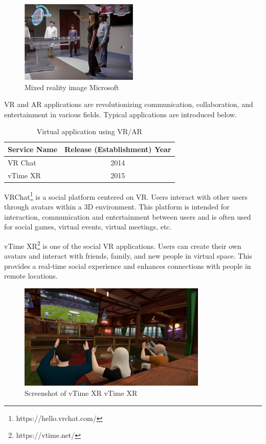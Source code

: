 \documentclass[12pt]{article}
\begin{document}
\begin{figure}[H]
    \centering
    \includegraphics[width=0.5\textwidth]{vrexample.jpg}
    \caption{Mixed reality image \textcopyright Microsoft}
    \label{fig:my_label}
\end{figure}

VR and AR applications are
revolutionizing communication, collaboration, and entertainment in various
fields. Typical applications are introduced below.

\begin{table}[h]
    \begin{center}
        \begin{tabular}{|l|c|} \hline
            Service Name & Release (Establishment) Year \\ \hline
            VR Chat      & 2014                         \\
            vTime XR     & 2015                         \\ \hline
        \end{tabular}
        \caption{Virtual application using VR/AR}
    \end{center}
\end{table}

VRChat\footnote{https://hello.vrchat.com/} is a social platform centered on VR.
Users interact with other users
through avatars within a 3D environment. This platform is intended for
interaction, communication and entertainment between users and is often used
for social games, virtual events, virtual meetings, etc.

vTime XR\footnote{https://vtime.net/} is one of the social VR applications.
Users can create their own
avatars and interact with friends, family, and new people in virtual space.
This provides a real-time social experience and enhances connections with
people in remote locations.

\begin{figure}[H]
    \centering
    \includegraphics[width=0.8\textwidth]{vtimexr.png}
    \caption{Screenshot of vTime XR \textcopyright vTime XR}
    \label{fig:my_label}
\end{figure}
\end{document}
